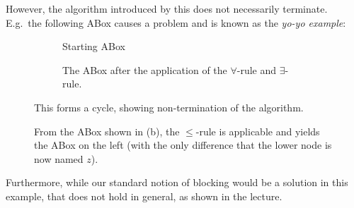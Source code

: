 However, the algorithm introduced by this does not necessarily terminate.
E.g.\ the following ABox causes a problem and is known as the \textit{yo-yo example}:
	\begin{figure}[H]
		\centering
		\begin{subfigure}[t]{.475\textwidth}
			\centering
			\caption{Starting ABox}
		\end{subfigure}
		\hfill
		\begin{subfigure}[t]{.475\textwidth}
			\centering
			\caption{The ABox after the application of the $\forall$-rule and $\exists$-rule.}
		\end{subfigure}
		\caption{From the ABox shown in (b), the $ \leq$-rule is applicable and yields the ABox on the left
		(with the only difference that the lower node is now named $z$).}
		This forms a cycle, showing non-termination of the algorithm.
	\end{figure}

Furthermore, while our standard notion of blocking would be a solution in this example,
that does not hold in general, as shown in the lecture.
